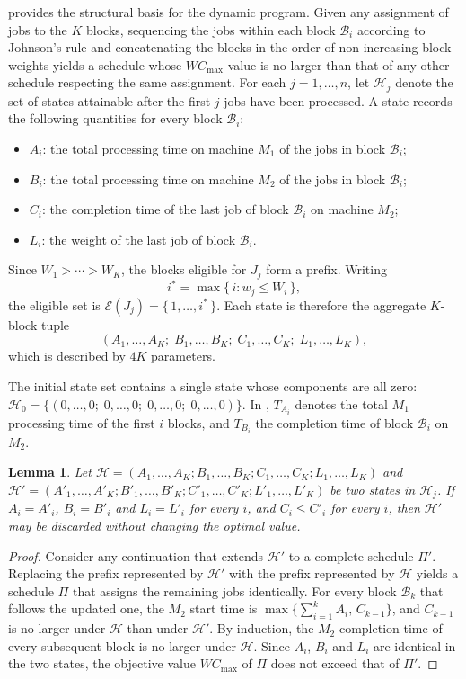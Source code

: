 ﻿\documentclass[12pt]{article}
\newtheorem{lemma}{Lemma}[section]
\begin{document}
\begin{sloppypar}
 provides the structural basis for the dynamic program. Given any
assignment of jobs to the $K$ blocks, sequencing the jobs within each block $\mathcal{B}_i$
according to Johnson's rule and concatenating the blocks in the order of non-increasing block
weights yields a schedule whose $W C_{\max}$ value is no larger than that of any other schedule
respecting the same assignment.
For each $j = 1,\dots,n$, let $\mathscr{H}_j$ denote the set of states attainable after the first
$j$ jobs have been processed. A state records the following quantities for every block
$\mathcal{B}_i$:
\begin{itemize}
    \item $A_i$: the total processing time on machine $M_1$ of the jobs in block $\mathcal{B}_i$;
    \item $B_i$: the total processing time on machine $M_2$ of the jobs in block $\mathcal{B}_i$;
    \item $C_i$: the completion time of the last job of block $\mathcal{B}_i$ on machine $M_2$;
    \item $L_i$: the weight of the last job of block $\mathcal{B}_i$.
\end{itemize}
Since $W_1 > \cdots > W_K$, the blocks eligible for $J_j$ form a prefix. Writing
\[
    i^* = \max\{\, i : w_j \le W_i \,\},
\]
the eligible set is $\mathcal{E}(J_j) = \{\, 1,\dots,i^* \,\}$.
Each state is therefore the aggregate $K$-block tuple
\[
    (A_1,\dots,A_K; \; B_1,\dots,B_K; \; C_1,\dots,C_K; \; L_1,\dots,L_K),
\]
which is described by $4K$ parameters.

The initial state set contains a single state whose components are all zero:
$\mathscr{H}_{0} = \{ (0,\dots,0; \; 0,\dots,0; \; 0,\dots,0; \; 0,\dots,0) \}$.
In , $T_{A_i}$ denotes the total $M_1$ processing time of the first
$i$ blocks, and $T_{B_i}$ the completion time of block $\mathcal{B}_i$ on $M_2$.

\begin{lemma}\label{lem:merge-dominance}
Let $\mathscr{H} = (A_1,\dots,A_K; B_1,\dots,B_K; C_1,\dots,C_K; L_1,\dots,L_K)$ and
$\mathscr{H}' = (A'_1,\dots,A'_K; B'_1,\dots,B'_K; C'_1,\dots,C'_K; L'_1,\dots,L'_K)$ be two states
in $\mathscr{H}_j$. If $A_i = A'_i$, $B_i = B'_i$ and $L_i = L'_i$ for every $i$, and
$C_i \le C'_i$ for every $i$, then $\mathscr{H}'$ may be discarded without changing the optimal
value.
\end{lemma}
\begin{proof}
Consider any continuation that extends $\mathscr{H}'$ to a complete schedule $\Pi'$. Replacing the
prefix represented by $\mathscr{H}'$ with the prefix represented by $\mathscr{H}$ yields a schedule
$\Pi$ that assigns the remaining jobs identically. For every block $\mathcal{B}_k$ that follows the
updated one, the $M_2$ start time is $\max\{\sum_{i=1}^{k}A_{i},\, C_{k-1}\}$, and $C_{k-1}$ is no
larger under $\mathscr{H}$ than under $\mathscr{H}'$. By induction, the $M_2$ completion time of
every subsequent block is no larger under $\mathscr{H}$. Since $A_i$, $B_i$ and $L_i$ are identical
in the two states, the objective value $W C_{\max}$ of $\Pi$ does not exceed that of $\Pi'$.
\end{proof}


\end{sloppypar}
\end{document}
